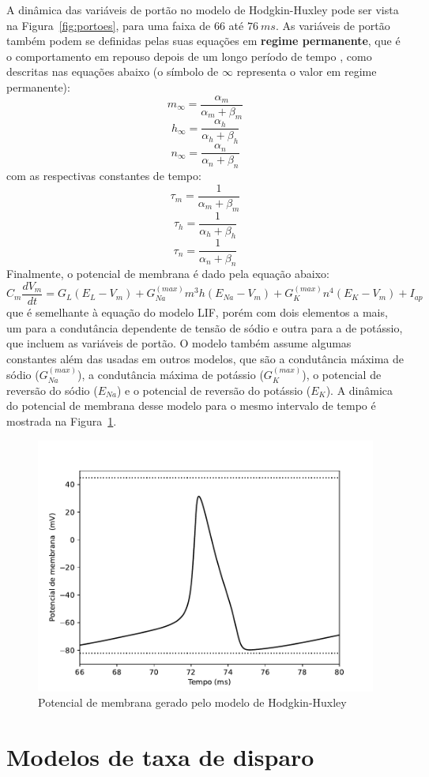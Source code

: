 A dinâmica das variáveis de portão no modelo de Hodgkin-Huxley pode ser vista na Figura~\ref{fig:portoes}, para uma faixa de 66 até $76\ ms$. As variáveis de portão também podem se definidas pelas suas equações em \textbf{regime permanente}, que é o comportamento em repouso depois de um longo período de tempo \cite{ermentrout_mathematical_2010}, como descritas nas equações abaixo (o símbolo de $\infty$ representa o valor em regime permanente):
\begin{equation}\label{eq:m_inf}
	m_\infty=\frac{\alpha_m}{\alpha_m+\beta_m}
\end{equation}
\begin{equation}\label{eq:h_inf}
	h_\infty=\frac{\alpha_h}{\alpha_h+\beta_h}
\end{equation}
\begin{equation}\label{eq:n_inf}
	n_\infty=\frac{\alpha_n}{\alpha_n+\beta_n}
\end{equation}
com as respectivas constantes de tempo:
\begin{equation}\label{eq:tau_m}
	\tau_m=\frac{1}{\alpha_m+\beta_m}
\end{equation}
\begin{equation}\label{eq:tau_n}
	\tau_h=\frac{1}{\alpha_h+\beta_h}
\end{equation}
\begin{equation}\label{eq:tau_h}
	\tau_n=\frac{1}{\alpha_n+\beta_n}
\end{equation}
Finalmente, o potencial de membrana é dado pela equação abaixo:
\begin{equation}\label{eq:hodgkin_huxley}
	C_m\frac{dV_m}{dt}=G_L(E_L-V_m)+G_{Na}^{(max)}m^3h(E_{Na}-V_m)+G_K^{(max)}n^4(E_K-V_m)+I_{ap}
\end{equation}
que é semelhante à equação do modelo LIF, porém com dois elementos a mais, um para a condutância dependente de tensão de sódio e outra para a de potássio, que incluem as variáveis de portão. O modelo também assume algumas constantes além das usadas em outros modelos, que são a condutância máxima de sódio ($G_{Na}^{(max)}$), a condutância máxima de potássio ($G_K^{(max)}$), o potencial de reversão do sódio ($E_{Na}$) e o potencial de reversão do potássio ($E_K$). A dinâmica do potencial de membrana desse modelo para o mesmo intervalo de tempo é mostrada na Figura~\ref{fig:hhvm}.

\begin{figure}[tb]
	\centering
	\caption{Potencial de membrana gerado pelo modelo de Hodgkin-Huxley}
	\label{fig:hhvm}
	\includegraphics[width=0.7\linewidth]{figs/hh_vm}
\end{figure}
\section{Modelos de taxa de disparo}\label{sec:modelostaxa}
